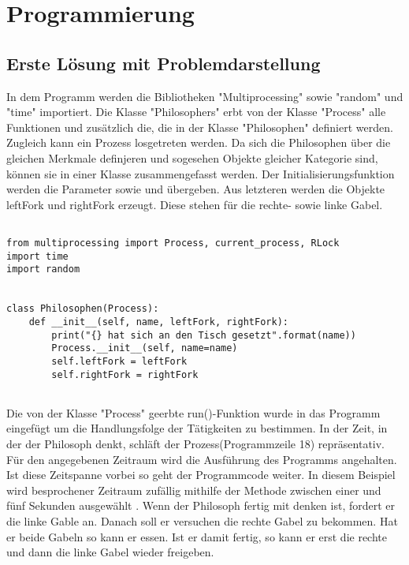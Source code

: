 \chapter{Programmierung}
\label{programmierung}


\section{Erste Lösung mit Problemdarstellung}
\label{erste_lösung}

In dem Programm werden die Bibliotheken "Multiprocessing" sowie "random" und "time" importiert. Die Klasse "Philosophers" erbt von der Klasse "Process" alle Funktionen und zusätzlich die, die in der Klasse "Philosophen" definiert werden. Zugleich kann ein Prozess losgetreten werden. Da sich die Philosophen über die gleichen Merkmale definjeren und sogesehen Objekte gleicher Kategorie sind, können sie in einer Klasse zusammengefasst werden. Der Initialisierungsfunktion werden die Parameter  sowie  und   übergeben. Aus letzteren werden die Objekte leftFork und rightFork erzeugt. Diese stehen für die rechte- sowie linke Gabel.

\begin{lstlisting}[style = Python, label = {erste Lösung}, caption = {Klasse Philosophen}]

from multiprocessing import Process, current_process, RLock
import time
import random


class Philosophen(Process):
    def __init__(self, name, leftFork, rightFork):
        print("{} hat sich an den Tisch gesetzt".format(name))
        Process.__init__(self, name=name)
        self.leftFork = leftFork
        self.rightFork = rightFork
        
\end{lstlisting}

Die von der Klasse "Process" geerbte run()-Funktion wurde in das Programm eingefügt um die Handlungsfolge der Tätigkeiten zu bestimmen. In der Zeit, in der der Philosoph denkt, schläft der Prozess(Programmzeile 18) repräsentativ. Für den angegebenen Zeitraum wird die Ausführung des Programms angehalten. Ist diese Zeitspanne vorbei so geht der Programmcode weiter. In diesem Beispiel wird besprochener Zeitraum zufällig mithilfe der  Methode zwischen einer und fünf Sekunden ausgewählt \parencite{sleep}. Wenn der Philosoph fertig mit denken ist, fordert er die linke Gable an. Danach soll er versuchen die rechte Gabel zu bekommen. Hat er beide Gabeln so kann er essen. Ist er damit fertig, so kann er erst die rechte und dann die linke Gabel wieder freigeben.

